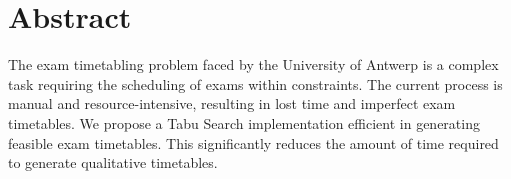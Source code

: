 
\section*{Abstract}

The exam timetabling problem faced by the University of Antwerp is a complex task requiring the scheduling of exams within constraints. The current process is manual and resource-intensive, resulting in lost time and imperfect exam timetables. We propose a Tabu Search implementation efficient in generating feasible exam timetables. This significantly reduces the amount of time required to generate qualitative timetables.